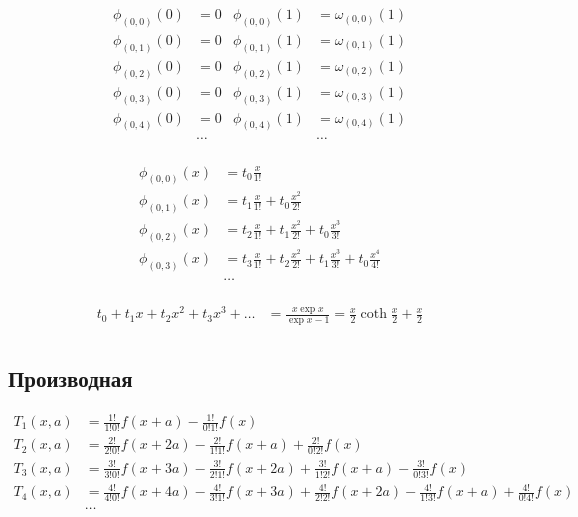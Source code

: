 \begin{equation*} \begin{aligned}
\phi_{(0,0)}(0) &= 0 & \phi_{(0,0)}(1) &= \omega_{(0,0)}(1)
\\
\phi_{(0,1)}(0) &= 0 & \phi_{(0,1)}(1) &= \omega_{(0,1)}(1)
\\
\phi_{(0,2)}(0) &= 0 & \phi_{(0,2)}(1) &= \omega_{(0,2)}(1)
\\
\phi_{(0,3)}(0) &= 0 & \phi_{(0,3)}(1) &= \omega_{(0,3)}(1)
\\
\phi_{(0,4)}(0) &= 0 & \phi_{(0,4)}(1) &= \omega_{(0,4)}(1)
\\
&\ldots & &\ldots
\\
\end{aligned} \end{equation*}

\begin{equation*} \begin{aligned}
\phi_{(0,0)}(x) &= 
  t_0 \frac{x}{1!} 
\\
\phi_{(0,1)}(x) &= 
  t_1 \frac{x}{1!} 
+ t_0 \frac{x^2}{2!} 
\\
\phi_{(0,2)}(x) &= 
  t_2 \frac{x}{1!} 
+ t_1 \frac{x^2}{2!} 
+ t_0 \frac{x^3}{3!} 
\\
\phi_{(0,3)}(x) &= 
  t_3 \frac{x}{1!} 
+ t_2 \frac{x^2}{2!} 
+ t_1 \frac{x^3}{3!} 
+ t_0 \frac{x^4}{4!} 
\\
&\ldots
\\
\end{aligned} \end{equation*}

\begin{equation*} \begin{aligned}
  t_0
+ t_1 x
+ t_2 x^2
+ t_3 x^3
+ \ldots
&
= \frac{x \exp{x}}{\exp{x} - 1}
= \frac{x}{2} \coth{\frac{x}{2}} 
+ \frac{x}{2}
\\
\end{aligned} \end{equation*}

\subsection{Производная}

\begin{equation*}
\begin{aligned}
T_1(x,a) &= 
  \frac{1!}{1!0!} f(x + a) 
- \frac{1!}{0!1!} f(x)
\\
T_2(x,a) &= 
  \frac{2!}{2!0!} f(x + 2 a) 
- \frac{2!}{1!1!} f(x + a) 
+ \frac{2!}{0!2!} f(x)
\\
T_3(x,a) &=
  \frac{3!}{3!0!} f(x + 3 a) 
- \frac{3!}{2!1!} f(x + 2 a) 
+ \frac{3!}{1!2!} f(x + a)
- \frac{3!}{0!3!} f(x)
\\
T_4(x,a) &= 
  \frac{4!}{4!0!} f(x + 4 a) 
- \frac{4!}{3!1!} f(x + 3 a) 
+ \frac{4!}{2!2!} f(x + 2 a) 
- \frac{4!}{1!3!} f(x + a) 
+ \frac{4!}{0!4!} f(x)
\\
&\ldots
\\
\end{aligned}
\end{equation*}

